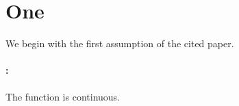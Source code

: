 \documentclass{article}
\begin{document}
\section{One}
We begin with the first assumption of the cited paper.
\paragraph{\cite[Assumption 2.4]{key}:} The function is continuous.
\end{document}
